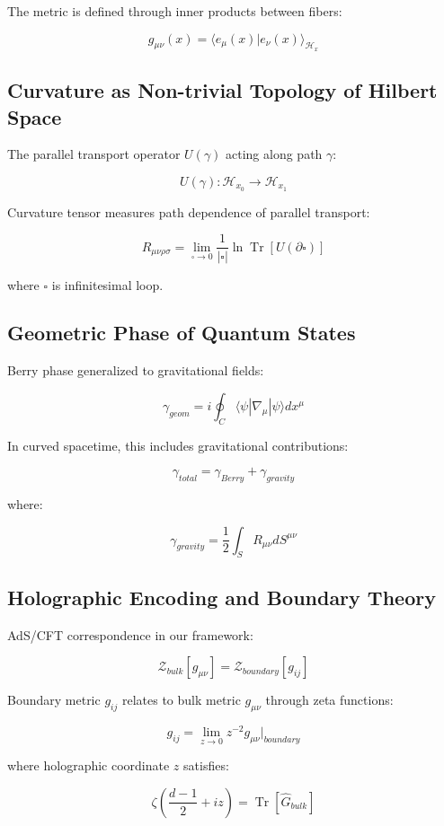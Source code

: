 \documentclass[12pt,a4paper]{article}
\DeclareMathOperator{\Tr}{Tr}
\begin{document}
The metric is defined through inner products between fibers:

$$g_{\mu\nu}(x) = \langle e_\mu(x) | e_\nu(x) \rangle_{\mathcal{H}_x}$$

\subsection{Curvature as Non-trivial Topology of Hilbert Space}

The parallel transport operator $U(\gamma)$ acting along path $\gamma$:

$$U(\gamma): \mathcal{H}_{x_0} \rightarrow \mathcal{H}_{x_1}$$

Curvature tensor measures path dependence of parallel transport:

$$R_{\mu\nu\rho\sigma} = \lim_{\square \to 0} \frac{1}{|\square|} \ln \Tr[U(\partial\square)]$$

where $\square$ is infinitesimal loop.

\subsection{Geometric Phase of Quantum States}

Berry phase generalized to gravitational fields:

$$\gamma_{geom} = i\oint_C \langle \psi | \nabla_\mu | \psi \rangle dx^\mu$$

In curved spacetime, this includes gravitational contributions:

$$\gamma_{total} = \gamma_{Berry} + \gamma_{gravity}$$

where:

$$\gamma_{gravity} = \frac{1}{2} \int_S R_{\mu\nu} dS^{\mu\nu}$$

\subsection{Holographic Encoding and Boundary Theory}

AdS/CFT correspondence in our framework:

$$\mathcal{Z}_{bulk}[g_{\mu\nu}] = \mathcal{Z}_{boundary}[g_{ij}]$$

Boundary metric $g_{ij}$ relates to bulk metric $g_{\mu\nu}$ through zeta functions:

$$g_{ij} = \lim_{z \to 0} z^{-2} g_{\mu\nu} \bigg|_{boundary}$$

where holographic coordinate $z$ satisfies:

$$\zeta\left(\frac{d-1}{2} + iz\right) = \Tr[\hat{G}_{bulk}]$$
\end{document}
